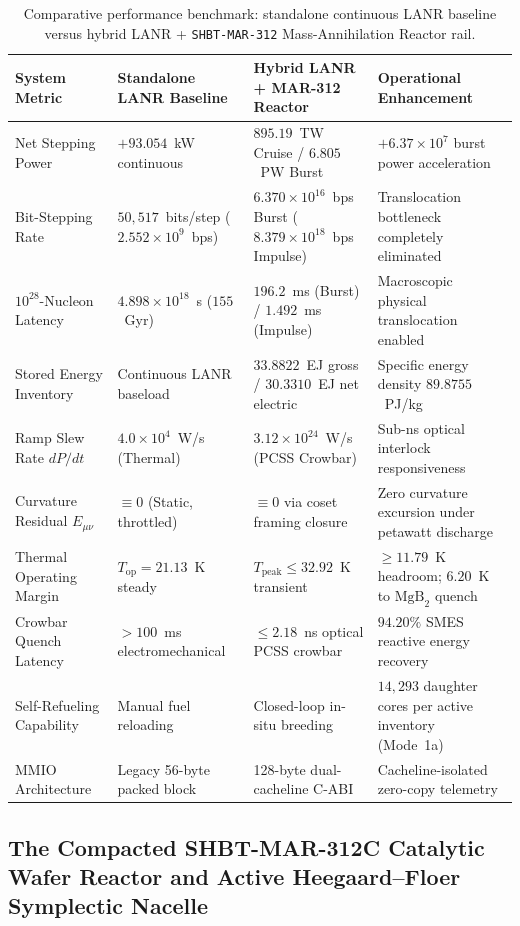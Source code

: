 \documentclass[11pt,onecolumn]{article}
\begin{document}
\begin{table}[!htbp]
\centering\small
\caption{Comparative performance benchmark: standalone continuous LANR baseline versus hybrid LANR + \texttt{SHBT-MAR-312} Mass-Annihilation Reactor rail.}
\label{tab:benchmark}
\begin{tabularx}{\textwidth}{@{}l p{3.8cm} p{4.2cm} X@{}}
\toprule
System Metric & Standalone LANR Baseline & Hybrid LANR + MAR-312 Reactor & Operational Enhancement \\
\midrule
Net Stepping Power & $+93.054$~kW continuous & $895.19$~TW Cruise / $6.805$~PW Burst & $+6.37\times 10^7$ burst power acceleration \\
Bit-Stepping Rate & $50{,}517$~bits/step ($2.552\times 10^9$~bps) & $6.370\times 10^{16}$~bps Burst ($8.379\times 10^{18}$~bps Impulse) & Translocation bottleneck completely eliminated \\
$10^{28}$-Nucleon Latency & $4.898\times 10^{18}$~s ($155$~Gyr) & $196.2$~ms (Burst) / $1.492$~ms (Impulse) & Macroscopic physical translocation enabled \\
Stored Energy Inventory & Continuous LANR baseload & $33.8822$~EJ gross / $30.3310$~EJ net electric & Specific energy density $89.8755$~PJ/kg \\
Ramp Slew Rate $dP/dt$ & $4.0\times 10^4$~W/s (Thermal) & $3.12\times 10^{24}$~W/s (PCSS Crowbar) & Sub-ns optical interlock responsiveness \\
Curvature Residual $E_{\mu\nu}$ & $\equiv 0$ (Static, throttled) & $\equiv 0$ via coset framing closure & Zero curvature excursion under petawatt discharge \\
Thermal Operating Margin & $T_{\text{op}} = 21.13$~K steady & $T_{\text{peak}} \le 32.92$~K transient & $\ge 11.79$~K headroom; $6.20$~K to $\text{MgB}_2$ quench \\
Crowbar Quench Latency & $>100$~ms electromechanical & $\le 2.18$~ns optical PCSS crowbar & $94.20\%$ SMES reactive energy recovery \\
Self-Refueling Capability & Manual fuel reloading & Closed-loop in-situ breeding & $14{,}293$ daughter cores per active inventory (Mode~1a) \\
MMIO Architecture & Legacy 56-byte packed block & 128-byte dual-cacheline C-ABI & Cacheline-isolated zero-copy telemetry \\
\bottomrule
\end{tabularx}
\end{table}

\FloatBarrier
\FloatBarrier
\subsection{The Compacted SHBT-MAR-312C Catalytic Wafer Reactor and Active Heegaard--Floer Symplectic Nacelle}
\label{sec:mar312c}
\end{document}
